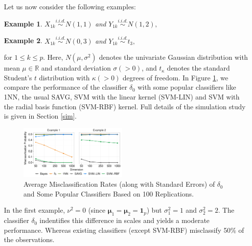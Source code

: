 \documentclass[twoside]{article}
\newcommand{\bmu}{\boldsymbol{\mu}}
\newcommand{\0}{\mathbf{0}}
\newcommand{\1}{\mathbf{1}}
\numberwithin{equation}{section}
\newtheorem{ex}{Example}
\begin{document}
Let us now consider the following examples:
\vspace{-0.25cm}
\begin{ex}\label{ex1}
 $X_{1k}\stackrel{i.i.d.}{\sim} N(1,1)$ and $Y_{1k}\stackrel{i.i.d.}{\sim} N(1,2),$
\end{ex}
\begin{ex}\label{ex2}
 $X_{1k}\stackrel{i.i.d.}{\sim} N(0,3)$ and $Y_{1k}\stackrel{i.i.d.}{\sim} t_3,$
\end{ex}
\vspace{-0.25cm}
for $1\le k\le p$. Here, $N(\mu,\sigma^2)$ denotes the univariate Gaussian distribution with mean $\mu\in\mathbb{R}$ and standard deviation $\sigma(>0)$, and $t_{\kappa}$ denotes the standard Student's $t$ distribution with $\kappa(>0)$ degrees of freedom. In Figure \ref{plot0}, we compare the performance of the classifier $\delta_0$ with some popular classifiers like 1NN, the usual SAVG, SVM with the  linear kernel (SVM-LIN) and SVM with the radial basis function (SVM-RBF) kernel. Full details of the simulation study is given in Section \ref{sim}.
\begin{figure}[H]
\vspace{-.1in}
  \centering
    \includegraphics[width = 0.475\textwidth, height = 0.25\textwidth]{intro_plot_split1-2.pdf}
\caption{Average Misclassification Rates (along with Standard Errors) of $\delta_0$ and Some Popular Classifiers Based on 100 Replications.}
  \label{plot0}
\end{figure}
\vspace{-0.5cm}
In the first example, $\nu^2=0$ (since $\bmu_{1}=\bmu_{2}=\1_p$) but $\sigma^2_1=1$ and $\sigma^2_2=2$. The classifier $\delta_0$ indentifies this difference in scales and yields a moderate performance. Whereas existing classifiers (except SVM-RBF) misclassify 50\% of the observations. %
\end{document}
